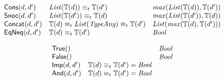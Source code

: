 \documentclass[fleqn,a4paper]{article}
\newcommand{\aterm}[1]{\mathsf{#1}}
\newcommand{\type}{\mathbb{T}}
\newcommand{\List}{\nm{List}}
\newcommand{\TypeAny}{\nm{TypeAny}}
\newcommand{\typecompat}{\equiv_t}
\begin{document}
\begin{displaymath}
\begin{array}{lll}
\aterm{Cons}(d, d')                  & \List(\type(d))\typecompat\type(d')                        & \nm{max}(\List(\type(d)),\type(d'))\\
\aterm{Snoc}(d, d')                  & \List(\type(d'))\typecompat\type(d)                        & \nm{max}(\List(\type(d')),\type(d))\\
\aterm{Concat}(d, d')                & \type(d)\typecompat\List(\TypeAny)\typecompat\type(d')     & \List(\nm{max}(\type(d),\type(d')))\\
\aterm{EqNeq}(d, d')                 & \type(d)\typecompat\type(d')                               & \Bool
\end{array}
\end{displaymath}

\begin{displaymath}
\begin{array}{lll}
\aterm{True}()                       &                                                            & \Bool\\
\aterm{False}()                      &                                                            & \Bool\\
\aterm{Imp}(d, d')                   & \type(d)\typecompat\type(d')=\Bool                         &\\
\aterm{And}(d, d')                   & \type(d)\typecompat\type(d')=\Bool                         &
\end{array}
\end{displaymath}
\end{document}
